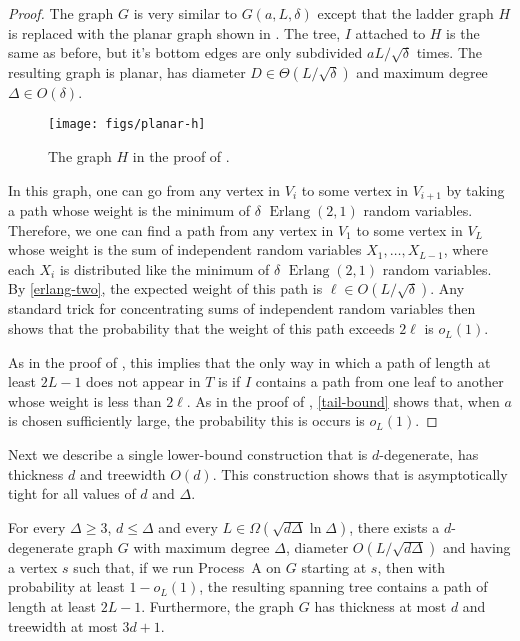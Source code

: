 \documentclass{patmorin}
\DeclareMathOperator{\erlang}{Erlang}
\begin{document}
\begin{proof}
  The graph $G$ is very similar to $G(a, L,\delta)$ except that the ladder
  graph $H$ is replaced with the planar graph shown in .
  The tree, $I$ attached to $H$ is the same as before, but it's bottom
  edges are only subdivided $aL/\sqrt{\delta}$ times.  The resulting
  graph is planar, has diameter $D\in\Theta(L/\sqrt{\delta})$ and maximum
  degree $\Delta\in O(\delta)$.

  \begin{figure}
    \begin{center}
      \texttt{[image: figs/planar-h]}
    \end{center}
    \caption{The graph $H$ in the proof of .}
  \end{figure}
 
  In this graph, one can go from any vertex in $V_i$ to some vertex in
  $V_{i+1}$ by taking a path whose weight is the minimum of $\delta$
  $\erlang(2,1)$ random variables.   Therefore, we one can find a path
  from any vertex in $V_1$ to some vertex in $V_L$ whose weight is the
  sum of independent random variables $X_1,\ldots,X_{L-1}$, where each
  $X_i$ is distributed like the minimum of $\delta$ $\erlang(2,1)$
  random variables.  By \eqref{erlang-two}, the expected weight of
  this path is $\ell \in O(L/\sqrt{\delta})$.  Any standard trick for
  concentrating sums of independent random variables then shows that the
  probability that the weight of this path exceeds $2\ell$ is $o_L(1)$.

  As in the proof of , this implies
  that the only way in which a path of length at least $2L-1$ does not
  appear in $T$ is if $I$ contains a path from one leaf to another whose
  weight is less than $2\ell$.  As in the proof of ,
  \eqref{tail-bound} shows that, when $a$ is chosen sufficiently large,
  the probability this is occurs is $o_L(1)$.
\end{proof}

Next we describe a single lower-bound construction that is $d$-degenerate,
has thickness $d$ and treewidth $O(d)$.  This construction shows that
 is asymptotically tight for
all values of $d$ and $\Delta$.

\begin{thm}
  For every $\Delta\ge 3$, $d\le \Delta$ and every
  $L\in\Omega(\sqrt{d\Delta}\ln\Delta)$, there exists a $d$-degenerate
  graph $G$ with maximum degree $\Delta$, diameter $O(L/\sqrt{d\Delta})$
  and having a vertex $s$ such that, if we run Process~A on $G$ starting
  at $s$, then with probability at least $1-o_L(1)$, the resulting
  spanning tree contains a path of length at least $2L-1$. Furthermore,
  the graph $G$ has thickness at most $d$ and treewidth at most $3d+1$.
\end{thm}
\end{document}
